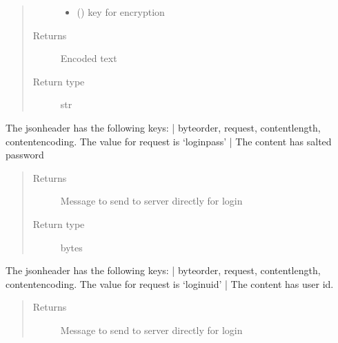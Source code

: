 \documentclass[letterpaper,10pt,english]{sphinxmanual}
\begin{document}
\begin{fulllineitems}
\begin{fulllineitems}
\begin{quote}
\begin{description}
\begin{itemize}
\item {} 
 () \textendash{} key for encryption

\end{itemize}

\item[{Returns}] \leavevmode
Encoded text

\item[{Return type}] \leavevmode
str

\end{description}\end{quote}

\end{fulllineitems}


\begin{fulllineitems}
\label{\detokenize{Message:Message.Message._create_loginpass_request}}
The jsonheader has the following keys: |
byteorder, request, content\sphinxhyphen{}length, content\sphinxhyphen{}encoding. The value for request is ‘loginpass’ |
The content has salted password
\begin{quote}\begin{description}
\item[{Returns}] \leavevmode
Message to send to server directly for login

\item[{Return type}] \leavevmode
bytes

\end{description}\end{quote}

\end{fulllineitems}


\begin{fulllineitems}
\label{\detokenize{Message:Message.Message._create_loginuid_request}}
The jsonheader has the following keys: |
byteorder, request, content\sphinxhyphen{}length, content\sphinxhyphen{}encoding. The value for request is ‘loginuid’ |
The content has user id.
\begin{quote}\begin{description}
\item[{Returns}] \leavevmode
Message to send to server directly for login


\end{description}
\end{quote}
\end{fulllineitems}
\end{fulllineitems}
\end{document}
